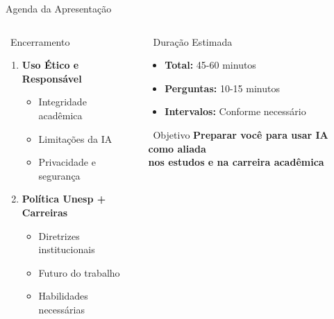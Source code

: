 \documentclass[aspectratio=169,12pt]{beamer}
\begin{document}
\begin{frame}{Agenda da Apresentação}
\begin{columns}[T]
\begin{column}{0.5\textwidth}
\begin{block}{\faListOl\, Encerramento}
\begin{enumerate}
                    \item<8-> \textbf{Uso Ético e Responsável}
                    \begin{itemize}
                        \item Integridade acadêmica
                        \item Limitações da IA
                        \item Privacidade e segurança
                    \end{itemize}

                    \item<9-> \textbf{Política Unesp + Carreiras}
                    \begin{itemize}
                        \item Diretrizes institucionais
                        \item Futuro do trabalho
                        \item Habilidades necessárias
                    \end{itemize}
                \end{enumerate}
            \end{block}
        \end{column}

        \begin{column}{0.5\textwidth}
            \begin{alertblock}{\faClock\, Duração Estimada}
                \begin{itemize}
                    \item \textbf{Total:} 45-60 minutos
                    \item \textbf{Perguntas:} 10-15 minutos
                    \item \textbf{Intervalos:} Conforme necessário
                \end{itemize}
            \end{alertblock}

            \begin{exampleblock}{\faLightbulb\, Objetivo}
                \centering
                \textbf{Preparar você para usar IA como aliada} \\
                \textbf{nos estudos e na carreira acadêmica}
            \end{exampleblock}
        \end{column}
    \end{columns}
\end{frame}
\end{document}
